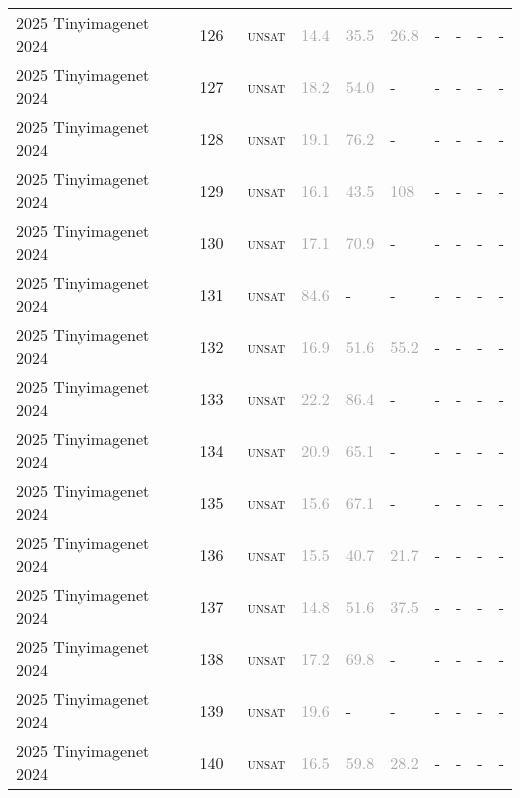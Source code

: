 \begin{center}
{\begin{longtable}{@{}llllllllll@{}}
2025 Tinyimagenet 2024 & 126 & ~\textsc{unsat} & \textcolor{darkgray}{14.4} & \textcolor{darkgray}{35.5} & \textcolor{darkgray}{26.8} & - & - & - & - \\
2025 Tinyimagenet 2024 & 127 & ~\textsc{unsat} & \textcolor{darkgray}{18.2} & \textcolor{darkgray}{54.0} & - & - & - & - & - \\
2025 Tinyimagenet 2024 & 128 & ~\textsc{unsat} & \textcolor{darkgray}{19.1} & \textcolor{darkgray}{76.2} & - & - & - & - & - \\
2025 Tinyimagenet 2024 & 129 & ~\textsc{unsat} & \textcolor{darkgray}{16.1} & \textcolor{darkgray}{43.5} & \textcolor{darkgray}{108} & - & - & - & - \\
2025 Tinyimagenet 2024 & 130 & ~\textsc{unsat} & \textcolor{darkgray}{17.1} & \textcolor{darkgray}{70.9} & - & - & - & - & - \\
2025 Tinyimagenet 2024 & 131 & ~\textsc{unsat} & \textcolor{darkgray}{84.6} & - & - & - & - & - & - \\
2025 Tinyimagenet 2024 & 132 & ~\textsc{unsat} & \textcolor{darkgray}{16.9} & \textcolor{darkgray}{51.6} & \textcolor{darkgray}{55.2} & - & - & - & - \\
2025 Tinyimagenet 2024 & 133 & ~\textsc{unsat} & \textcolor{darkgray}{22.2} & \textcolor{darkgray}{86.4} & - & - & - & - & - \\
2025 Tinyimagenet 2024 & 134 & ~\textsc{unsat} & \textcolor{darkgray}{20.9} & \textcolor{darkgray}{65.1} & - & - & - & - & - \\
2025 Tinyimagenet 2024 & 135 & ~\textsc{unsat} & \textcolor{darkgray}{15.6} & \textcolor{darkgray}{67.1} & - & - & - & - & - \\
2025 Tinyimagenet 2024 & 136 & ~\textsc{unsat} & \textcolor{darkgray}{15.5} & \textcolor{darkgray}{40.7} & \textcolor{darkgray}{21.7} & - & - & - & - \\
2025 Tinyimagenet 2024 & 137 & ~\textsc{unsat} & \textcolor{darkgray}{14.8} & \textcolor{darkgray}{51.6} & \textcolor{darkgray}{37.5} & - & - & - & - \\
2025 Tinyimagenet 2024 & 138 & ~\textsc{unsat} & \textcolor{darkgray}{17.2} & \textcolor{darkgray}{69.8} & - & - & - & - & - \\
2025 Tinyimagenet 2024 & 139 & ~\textsc{unsat} & \textcolor{darkgray}{19.6} & - & - & - & - & - & - \\
2025 Tinyimagenet 2024 & 140 & ~\textsc{unsat} & \textcolor{darkgray}{16.5} & \textcolor{darkgray}{59.8} & \textcolor{darkgray}{28.2} & - & - & - & - \\

\end{longtable}}
\end{center}
